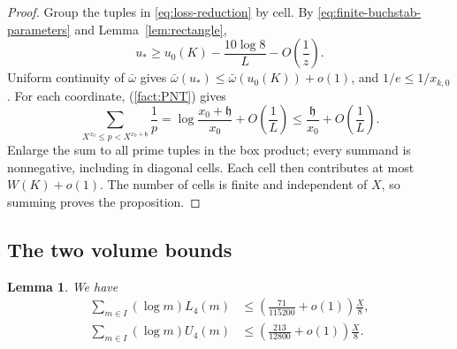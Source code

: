 \documentclass{amsart}
\newtheorem{lemma}{Lemma}[section]
\newcounter{fact}
\numberwithin{equation}{section}
\numberwithin{table}{section}
\begin{document}
\begin{proof}
Group the tuples in \eqref{eq:loss-reduction} by cell. By \eqref{eq:finite-buchstab-parameters} and Lemma~\ref{lem:rectangle},
\[
u_*\ge u_0(K)-\frac{10\log8}{L}-O\left(\frac1z\right).
\]
Uniform continuity of $\bar\omega$ gives
$\bar\omega(u_*)\le\bar\omega(u_0(K))+o(1)$, and $1/e\le1/x_{k,0}$.
For each coordinate, (\ref{fact:PNT}) gives
\[
\sum_{X^{x_0}\le p<X^{x_0+\mathfrak h}}\frac1p
=\log\frac{x_0+\mathfrak h}{x_0}+O\left(\frac1L\right)
\le\frac{\mathfrak h}{x_0}+O\left(\frac1L\right).
\]
Enlarge the sum to all prime tuples in the box product; every summand is
nonnegative, including in diagonal cells. Each cell then contributes at
most $W(K)+o(1)$. The number of cells is finite and independent of $X$,
so summing proves the proposition.
\end{proof}

\subsection{The two volume bounds}

\begin{lemma}\label{lem:volume-losses}
We have
\begin{equation}\label{eq:volume-losses}
\begin{aligned}
\sum_{m\in I}(\log m)L_4(m)
&\le\left(\frac{71}{115200}+o(1)\right)\frac X8,\\
\sum_{m\in I}(\log m)U_4(m)
&\le\left(\frac{213}{12800}+o(1)\right)\frac X8.
\end{aligned}
\end{equation}
\end{lemma}
\end{document}
